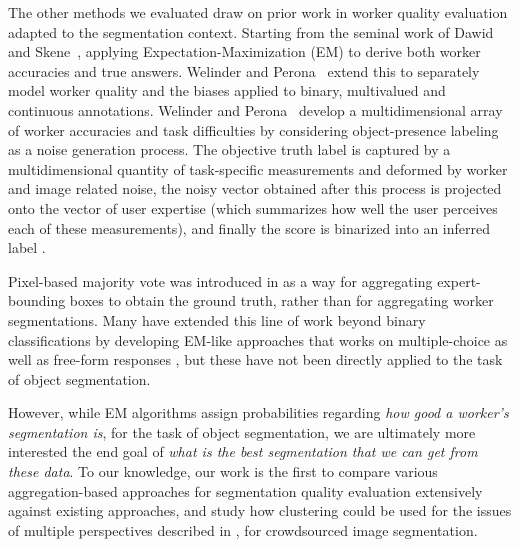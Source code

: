 \par {}The other methods we evaluated draw on prior work in worker quality evaluation adapted to the segmentation context. Starting from the seminal work of Dawid and Skene~\cite{Dawid1979}, applying Expectation-Maximization (EM) to derive both worker accuracies and true answers. Welinder and Perona~\cite{OCWelinder2010} extend this  to separately model worker quality and the biases applied to binary, multivalued and continuous annotations. Welinder and Perona~\cite{MDWWelinder2010} develop a multidimensional array of worker accuracies and task difficulties by considering object-presence labeling as a noise generation process. The objective truth label is captured by a multidimensional quantity of task-specific measurements and  deformed by worker and image related noise, the noisy vector obtained after this process is projected onto the vector of user expertise (which summarizes how well the user perceives each of these measurements), and finally the score is binarized into an inferred label .

Pixel-based majority vote  was introduced in \cite{Sameki2015} as a way for aggregating expert-bounding boxes to obtain the ground truth, rather than for aggregating worker segmentations. Many have extended this line of work beyond binary classifications by developing EM-like approaches that works on multiple-choice \cite{Karger2013} as well as free-form responses \cite{Lin2012}, but these have not been directly applied to the task of object segmentation.
\par However, while EM algorithms assign probabilities regarding  \textit{how good a worker's segmentation is}, for the task of object segmentation, we are ultimately more interested the end goal of \textit{what is the best segmentation that we can get from these data}. 
To our knowledge, our work is the first to compare various aggregation-based approaches for segmentation quality evaluation extensively against existing approaches, and study how clustering could be used for the issues of multiple perspectives described in \cite{Sorokin2008,Lin2014,Gurari2018}, for crowdsourced image segmentation.

